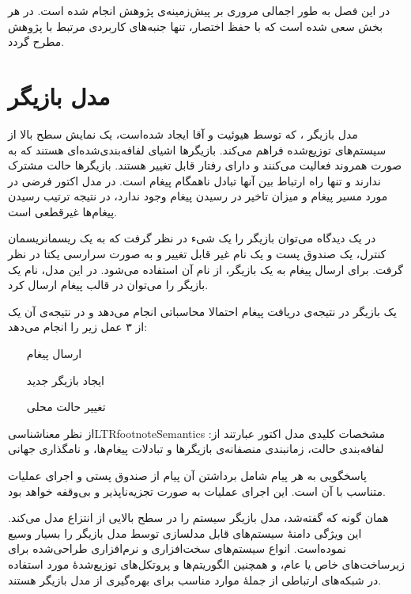 در این فصل به طور اجمالی مروری بر پیش‌زمینه‌ی پژوهش انجام شده است. در هر بخش سعی شده است که با حفظ اختصار، تنها جنبه‌های  کاربردی مرتبط با پژوهش مطرح گردد.

\section{مدل بازیگر}

\gls{مدل بازیگر}%
، که توسط هیوئیت و آقا \cite{Hewitt1972,Agha1987,Agha1990} ایجاد شده‌است، یک نمایش سطح بالا از سیستم‌های توزیع‌شده فراهم می‌کند. 
\gls{بازیگر}ها
اشیای \gls{لفافه‌بندی‌شده}‌ای هستند که به صورت \gls{همروند} فعالیت می‌کنند و دارای \gls{رفتار} قابل تغییر هستند. 
بازیگرها \gls{حالت  مشترک} ندارند و تنها راه ارتباط بین آنها تبادل ناهمگام پیغام است. 
 در مدل اکتور فرضی در مورد مسیر پیغام و میزان تاخیر در رسیدن پیغام وجود ندارد، در نتیجه ترتیب رسیدن پیغام‌ها \gls{غیرقطعی} است.
 
 در یک دیدگاه می‌توان بازیگر را یک \gls{شی‌ء} در نظر گرفت که به یک ریسمان\gls{ریسمان} کنترل، یک صندوق پست و یک نام غیر قابل تغییر و به صورت سرارسی یکتا  در نظر گرفت. برای ارسال پیغام به یک بازیگر، از نام آن استفاده می‌شود. در این مدل، نام  یک بازیگر را می‌توان در قالب پیغام  ارسال کرد.
 
 یک بازیگر در نتیجه‌ی دریافت پیغام احتمالا محاسباتی انجام می‌دهد و در نتیجه‌ی آن یک از ۳ عمل زیر را انجام می‌دهد:
\begin{itemize}
\item[ارسال پیغام]
\item[ایجاد بازیگر جدید]
\item[تغییر حالت محلی]

\end{itemize} 
از نظر \gls{معناشناسی}LTRfootnote{Semantics} مشخصات کلیدی مدل اکتور عبارتند از: لفافه‌بندی حالت،  زمانبندی منصفانه‌ی بازیگرها و تبادلات پیغام‌ها، و نامگذاری جهانی
 
پاسخگویی به هر پیام شامل برداشتن آن پیام از صندوق پستی و اجرای عملیات متناسب با آن است.
این اجرای عملیات به صورت \gls{تجزیه‌ناپذیر} و بی‌وقفه خواهد بود.

همان گونه که گفته‌شد، مدل بازیگر سیستم را در سطح بالایی از انتزاع مدل می‌کند.
این ویژگی دامنهٔ سیستم‌های قابل مدلسازی توسط مدل بازیگر را بسیار وسیع نموده‌است.
انواع سیستم‌های سخت‌افزاری و نرم‌افزاری طراحی‌شده برای زیرساخت‌های خاص یا عام، و همچنین الگوریتم‌ها و پروتکل‌های توزیع‌شدهٔ مورد استفاده در شبکه‌های ارتباطی از جملهٔ موارد مناسب برای بهره‌گیری از مدل بازیگر هستند.


